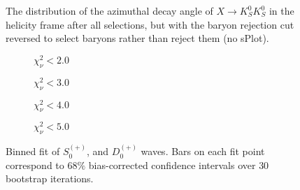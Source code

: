 \begin{figure}
  \begin{center}
    
  \end{center}
  \caption{The distribution of the azimuthal decay angle of $X \to K_S^0K_S^0$ in the helicity frame after all selections, but with the baryon rejection cut reversed to select baryons rather than reject them (no sPlot).}\label{fig:costheta-hx-v-meson-mass-data-pz-masscut-baryons}
\end{figure}


\begin{figure}[htbp]
    \centering
    \begin{subfigure}{0.45\textwidth}
        
        \caption{$\chi^2_\nu < 2.0$}
    \end{subfigure}
    \hfill
    \begin{subfigure}{0.45\textwidth}
        
        \caption{$\chi^2_\nu < 3.0$}
    \end{subfigure}
    \vspace{1em}
    \begin{subfigure}{0.45\textwidth}
        
        \caption{$\chi^2_\nu < 4.0$}
    \end{subfigure}
    \hfill
    \begin{subfigure}{0.45\textwidth}
        
        \caption{$\chi^2_\nu < 5.0$}
    \end{subfigure}

    \caption{Binned fit of $S_{0}^{(+)}$, and $D_{0}^{(+)}$ waves. Bars on each fit point correspond to $68\%$ bias-corrected confidence intervals over $ 30 $ bootstrap iterations.}
    \label{fig:binned-fit-all-Sp-D0p}
\end{figure}

